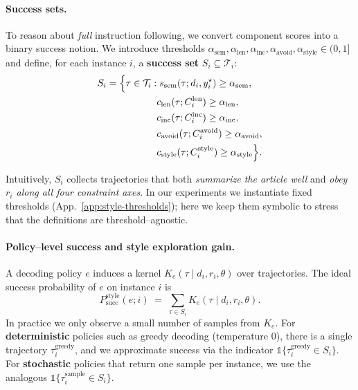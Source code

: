 \paragraph{Success sets.}
To reason about \emph{full} instruction following, we convert component
scores into a binary success notion. We introduce thresholds
$\alpha_{\text{sem}}, \alpha_{\text{len}}, \alpha_{\text{inc}},
 \alpha_{\text{avoid}}, \alpha_{\text{style}} \in (0,1]$ and define, for
each instance $i$, a \textbf{success set}
$S_i \subseteq \mathcal{T}_i$:
\[
\begin{aligned}
S_i
  &= \Bigl\{
        \tau \in \mathcal{T}_i :
        s_{\text{sem}}(\tau; d_i,y_i^\star) \ge \alpha_{\text{sem}},\\
  &\hphantom{=\Bigl\{\tau \in \mathcal{T}_i :\;}
        c_{\text{len}}(\tau; C^{\text{len}}_i) \ge \alpha_{\text{len}},\\
  &\hphantom{=\Bigl\{\tau \in \mathcal{T}_i :\;}
        c_{\text{inc}}(\tau; C^{\text{inc}}_i) \ge \alpha_{\text{inc}},\\
  &\hphantom{=\Bigl\{\tau \in \mathcal{T}_i :\;}
        c_{\text{avoid}}(\tau; C^{\text{avoid}}_i) \ge \alpha_{\text{avoid}},\\
  &\hphantom{=\Bigl\{\tau \in \mathcal{T}_i :\;}
        c_{\text{style}}(\tau; C^{\text{style}}_i) \ge \alpha_{\text{style}}
     \Bigr\}.
\end{aligned}
\]

Intuitively, $S_i$ collects trajectories that both \emph{summarize the
article well} and \emph{obey $r_i$ along all four constraint axes}. In
our experiments we instantiate fixed thresholds
(App.~\ref{app:style-thresholds}); here we keep them symbolic to stress
that the definitions are threshold--agnostic.

\paragraph{Policy--level success and style exploration gain.}
A decoding policy $e$ induces a kernel $K_e(\tau \mid d_i, r_i, \theta)$
over trajectories. The ideal success probability of $e$ on instance $i$
is
\[
  P_{\text{succ}}^{\text{style}}(e; i)
  \;=\;
  \sum_{\tau \in S_i}
  K_e(\tau \mid d_i, r_i, \theta).
\]
In practice we only observe a small number of samples from $K_e$. For
\textbf{deterministic} policies such as greedy decoding (temperature
$0$), there is a single trajectory
$\tau_i^{\text{greedy}}$, and we approximate success via the indicator
$\mathbb{1}\{\tau_i^{\text{greedy}} \in S_i\}$. For \textbf{stochastic}
policies that return one sample per instance, we use the analogous
$\mathbb{1}\{\tau_i^{\text{sample}} \in S_i\}$.

